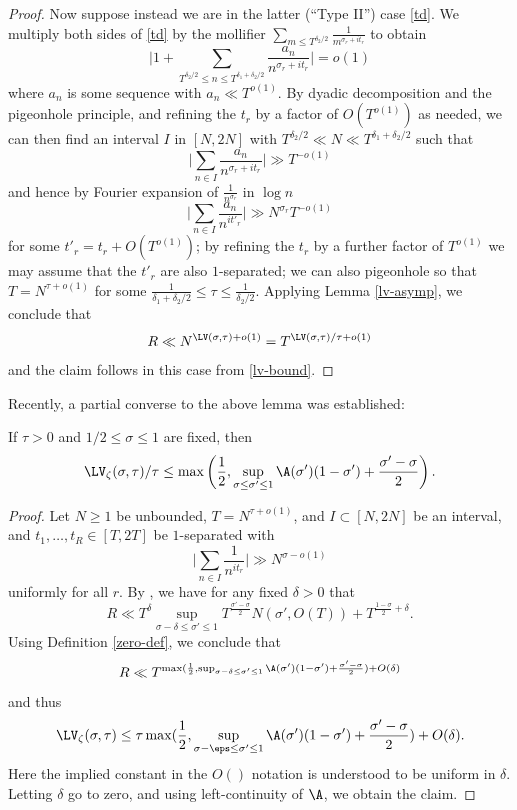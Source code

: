 \begin{proof}
Now suppose instead we are in the latter (``Type II'') case \eqref{td}.  We multiply both sides of \eqref{td} by the mollifier $\sum_{m \leq T^{\delta_2/2}} \frac{1}{m^{\sigma_r+it_r}}$ to obtain
$$ \bigg| 1 + \sum_{T^{\delta_2/2} \leq n \leq T^{\delta_1+\delta_2/2}} \frac{a_n}{n^{\sigma_r+it_r}} \bigg| = o(1)$$
where $a_n$ is some sequence with $a_n \ll T^{o(1)}$.  By dyadic decomposition and the pigeonhole principle, and refining the $t_r$ by a factor of $O(T^{o(1)})$ as needed, we can then find an interval $I$ in $[N,2N]$ with $T^{\delta_2/2} \ll N \ll T^{\delta_1+\delta_2/2}$ such that
$$ \bigg| \sum_{n \in I} \frac{a_n}{n^{\sigma_r+it_r}} \bigg| \gg T^{-o(1)}$$
and hence by Fourier expansion of $\frac{1}{n^{\sigma_r}}$ in $\log n$
$$ \bigg| \sum_{n \in I} \frac{a_n}{n^{it'_r}} \bigg| \gg N^{\sigma_r} T^{-o(1)}$$
for some $t'_r = t_r + O(T^{o(1)})$; by refining the $t_r$ by a further factor of $T^{o(1)}$ we may assume that the $t'_r$ are also $1$-separated; we can also pigeonhole so that $T = N^{\tau+o(1)}$ for some $\frac{1}{\delta_1+\delta_2/2} \leq \tau \leq \frac{1}{\delta_2/2}$.  Applying Lemma \ref{lv-asymp}, we conclude that
$$ R \ll N^{\LV(\sigma,\tau)+o(1)} = T^{\LV(\sigma,\tau)/\tau+o(1)}$$
and the claim follows in this case from \eqref{lv-bound}.
\end{proof}

Recently, a partial converse to the above lemma was established:

\begin{lemma}\label{zero-dens_implies_large}\cite[Theorem 1.2]{matomaki_teravainen_2024} If $\tau > 0$ and $1/2 \leq \sigma \leq 1$ are fixed, then
    $$ \LV_\zeta(\sigma,\tau)/\tau \leq \max\left( \frac{1}{2}, \sup_{\sigma \leq \sigma' \leq 1} \A(\sigma')(1-\sigma') + \frac{\sigma'-\sigma}{2} \right).$$
\end{lemma}

\begin{proof}  Let $N \geq 1$ be unbounded, $T = N^{\tau+o(1)}$, and $I \subset [N,2N]$ be an interval, and $t_1,\dots,t_R \in [T,2T]$ be $1$-separated with
$$ \bigg| \sum_{n \in I} \frac{1}{n^{it_r}} \bigg| \gg N^{\sigma-o(1)}$$
uniformly for all $r$.  By \cite[Theorem 1.2]{matomaki_teravainen_2024}, we have for any fixed $\delta>0$ that
$$ R \ll T^\delta \sup_{\sigma-\delta \leq \sigma' \leq 1} T^{\frac{\sigma' - \sigma}{2}} N(\sigma', O(T)) + T^{\frac{1-\sigma}{2}+\delta}.$$
Using Definition \ref{zero-def}, we conclude that
$$ R \ll T^{\max( \frac{1}{2}, \sup_{\sigma-\delta \leq \sigma' \leq 1} \A(\sigma')(1-\sigma') + \frac{\sigma'-\sigma}{2} ) + O(\delta)}$$
and thus
$$ \LV_\zeta(\sigma,\tau) \leq \tau \max( \frac{1}{2}, \sup_{\sigma-\eps \leq \sigma' \leq 1} \A(\sigma')(1-\sigma') + \frac{\sigma'-\sigma}{2} ) + O(\delta).$$
Here the implied constant in the $O()$ notation is understood to be uniform in $\delta$.
Letting $\delta$ go to zero, and using left-continuity of $\A$, we obtain the claim.
\end{proof}

